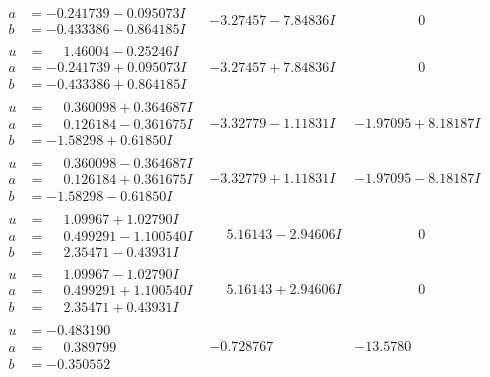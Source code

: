 \documentclass[1p]{elsarticle_modified}
\theoremstyle{definition}
\begin{document}
$$\begin{array}{c|c|c}
\begin{aligned}
a &= -0.241739 - 0.095073 I \\
b &= -0.433386 - 0.864185 I\end{aligned}
 & -3.27457 - 7.84836 I & \phantom{-0.000000 } 0 \\ \hline\begin{aligned}
u &= \phantom{-}1.46004 - 0.25246 I \\
a &= -0.241739 + 0.095073 I \\
b &= -0.433386 + 0.864185 I\end{aligned}
 & -3.27457 + 7.84836 I & \phantom{-0.000000 } 0 \\ \hline\begin{aligned}
u &= \phantom{-}0.360098 + 0.364687 I \\
a &= \phantom{-}0.126184 - 0.361675 I \\
b &= -1.58298 + 0.61850 I\end{aligned}
 & -3.32779 - 1.11831 I & -1.97095 + 8.18187 I \\ \hline\begin{aligned}
u &= \phantom{-}0.360098 - 0.364687 I \\
a &= \phantom{-}0.126184 + 0.361675 I \\
b &= -1.58298 - 0.61850 I\end{aligned}
 & -3.32779 + 1.11831 I & -1.97095 - 8.18187 I \\ \hline\begin{aligned}
u &= \phantom{-}1.09967 + 1.02790 I \\
a &= \phantom{-}0.499291 - 1.100540 I \\
b &= \phantom{-}2.35471 - 0.43931 I\end{aligned}
 & \phantom{-}5.16143 - 2.94606 I & \phantom{-0.000000 } 0 \\ \hline\begin{aligned}
u &= \phantom{-}1.09967 - 1.02790 I \\
a &= \phantom{-}0.499291 + 1.100540 I \\
b &= \phantom{-}2.35471 + 0.43931 I\end{aligned}
 & \phantom{-}5.16143 + 2.94606 I & \phantom{-0.000000 } 0 \\ \hline\begin{aligned}
u &= -0.483190\phantom{ +0.000000I} \\
a &= \phantom{-}0.389799\phantom{ +0.000000I} \\
b &= -0.350552\phantom{ +0.000000I}\end{aligned}
 & -0.728767\phantom{ +0.000000I} & -13.5780\phantom{ +0.000000I} \\ \hline\begin{aligned}

\end{aligned}
\end{array}$$
\end{document}
